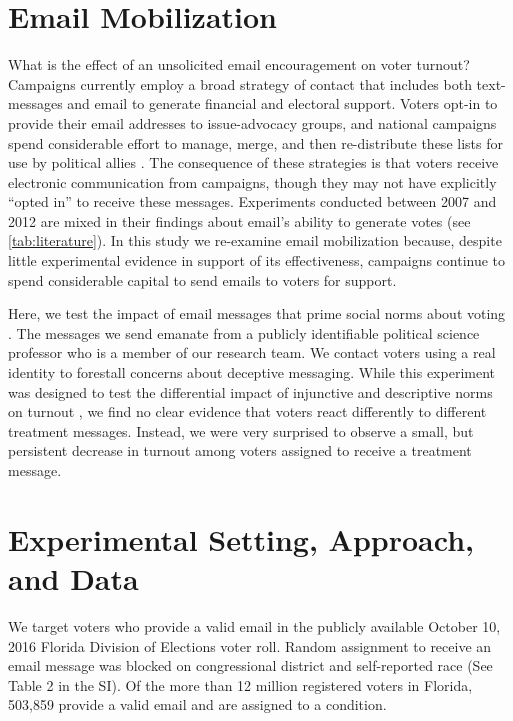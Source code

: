 \documentclass[12pt]{article}
\begin{document}
\setcounter{page}{1} \doublespacing

\section{Email Mobilization}

What is the effect of an unsolicited email encouragement on voter
turnout? Campaigns currently employ a broad strategy of contact that
includes both text-messages \citep{roose2018} and email
\citep{astor2019} to generate financial and electoral support. Voters
opt-in to provide their email addresses to issue-advocacy groups, and
national campaigns spend considerable effort to manage, merge, and
then re-distribute these lists for use by political allies
\citep{evers2019}. The consequence of these strategies is that voters
receive electronic communication from campaigns, though they may not
have explicitly “opted in” to receive these messages. Experiments
conducted between 2007 and 2012 are mixed in their findings about
email’s ability to generate votes (see \autoref{tab:literature}). In
this study we re-examine email mobilization because, despite little
experimental evidence in support of its effectiveness, campaigns
continue to spend considerable capital to send emails to voters for
support.

Here, we test the impact of email messages that prime social norms
about voting \citep{gerber2009}.  The messages we send emanate from a
publicly identifiable political science professor who is a member of
our research team. We contact voters using a real identity to
forestall concerns about deceptive messaging. While this experiment
was designed to test the differential impact of injunctive and
descriptive norms on turnout \citep{rivera2016}, we find no clear
evidence that voters react differently to different treatment
messages. Instead, we were very surprised to observe a small, but
persistent decrease in turnout among voters assigned to receive a
treatment message.



\section{Experimental Setting, Approach, and Data}

We target voters who provide a valid email in the publicly available
October 10, 2016 Florida Division of Elections voter roll. Random
assignment to receive an email message was blocked on congressional
district and self-reported race (See Table 2 in the SI). Of the more
than 12 million registered voters in Florida, 503,859 provide a valid
email and are assigned to a condition.
\end{document}

